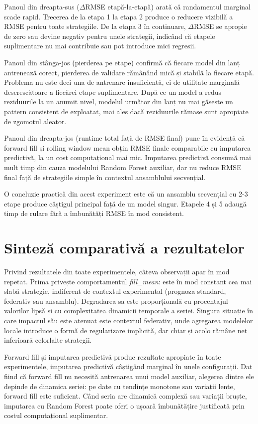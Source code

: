 Panoul din dreapta-sus ($\Delta$RMSE etapă-la-etapă) arată că randamentul marginal scade rapid. Trecerea de la etapa 1 la etapa 2 produce o reducere vizibilă a RMSE pentru toate strategiile. De la etapa 3 în continuare, $\Delta$RMSE se apropie de zero sau devine negativ pentru unele strategii, indicând că etapele suplimentare nu mai contribuie sau pot introduce mici regresii.

Panoul din stânga-jos (pierderea pe etape) confirmă că fiecare model din lanț antrenează corect, pierderea de validare rămânând mică și stabilă la fiecare etapă. Problema nu este deci una de antrenare insuficientă, ci de utilitate marginală descrescătoare a fiecărei etape suplimentare. După ce un model a redus reziduurile la un anumit nivel, modelul următor din lanț nu mai găsește un pattern consistent de exploatat, mai ales dacă reziduurile rămase sunt apropiate de zgomotul aleator.

Panoul din dreapta-jos (runtime total față de RMSE final) pune în evidență că forward fill și rolling window mean obțin RMSE finale comparabile cu imputarea predictivă, la un cost computațional mai mic. Imputarea predictivă consumă mai mult timp din cauza modelului Random Forest auxiliar, dar nu reduce RMSE final față de strategiile simple în contextul ansamblului secvențial.

O concluzie practică din acest experiment este că un ansamblu secvențial cu 2-3 etape produce câștigul principal față de un model singur. Etapele 4 și 5 adaugă timp de rulare fără a îmbunătăți RMSE în mod consistent.

\section{Sinteză comparativă a rezultatelor}

Privind rezultatele din toate experimentele, câteva observații apar în mod repetat. Prima privește comportamentul \textit{fill\_mean}: este în mod constant cea mai slabă strategie, indiferent de contextul experimental (prognoza standard, federativ sau ansamblu). Degradarea sa este proporțională cu procentajul valorilor lipsă și cu complexitatea dinamicii temporale a seriei. Singura situație în care impactul său este atenuat este contextul federativ, unde agregarea modelelor locale introduce o formă de regularizare implicită, dar chiar și acolo rămâne net inferioară celorlalte strategii.

Forward fill și imputarea predictivă produc rezultate apropiate în toate experimentele, imputarea predictivă câștigând marginal în unele configurații. Dat fiind că forward fill nu necesită antrenarea unui model auxiliar, alegerea dintre ele depinde de dinamica seriei: pe date cu tendințe monotone sau variații lente, forward fill este suficient. Când seria are dinamică complexă sau variații bruște, imputarea cu Random Forest poate oferi o ușoară îmbunătățire justificată prin costul computațional suplimentar.

